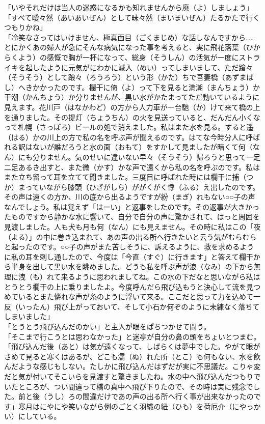 「いやそれだけは当人の迷惑になるかも知れませんから廃（よ）しましょう」\\
「すべて曖々然（あいあいぜん）として昧々然（まいまいぜん）たるかたで行くつもりかね」\\
「冷笑なさってはいけません、極真面目（ごくまじめ）な話しなんですから\ldots{}\ldots{}とにかくあの婦人が急にそんな病気になった事を考えると、実に飛花落葉（ひからくよう）の感慨で胸が一杯になって、総身（そうしん）の活気が一度にストライキを起したように元気がにわかに滅入（めい）ってしまいまして、ただ蹌々（そうそう）として踉々（ろうろう）という形（かた）ちで吾妻橋（あずまばし）へきかかったのです。欄干に倚（よ）って下を見ると満潮（まんちょう）か干潮（かんちょう）か分りませんが、黒い水がかたまってただ動いているように見えます。花川戸（はなかわど）の方から人力車が一台馳（か）けて来て橋の上を通りました。その提灯（ちょうちん）の火を見送っていると、だんだん小くなって札幌（さっぽろ）ビールの処で消えました。私はまた水を見る。すると遥（はる）かの川上の方で私の名を呼ぶ声が聞えるのです。はてな今時分人に呼ばれる訳はないが誰だろうと水の面（おもて）をすかして見ましたが暗くて何（なん）にも分りません。気のせいに違いない早々（そうそう）帰ろうと思って一足二足あるき出すと、また微（かす）かな声で遠くから私の名を呼ぶのです。私はまた立ち留って耳を立てて聞きました。三度目に呼ばれた時には欄干に捕（つか）まっていながら膝頭（ひざがしら）ががくがく悸（ふる）え出したのです。その声は遠くの方か、川の底から出るようですが紛（まぎ）れもない○○子の声なんでしょう。私は覚えず「はーい」と返事をしたのです。その返事が大きかったものですから静かな水に響いて、自分で自分の声に驚かされて、はっと周囲を見渡しました。人も犬も月も何（なん）にも見えません。その時に私はこの「夜（よる）」の中に巻き込まれて、あの声の出る所へ行きたいと云う気がむらむらと起ったのです。○○子の声がまた苦しそうに、訴えるように、救を求めるように私の耳を刺し通したので、今度は「今直（すぐ）に行きます」と答えて欄干から半身を出して黒い水を眺めました。どうも私を呼ぶ声が浪（なみ）の下から無理に洩（も）れて来るように思われましてね。この水の下だなと思いながら私はとうとう欄干の上に乗りましたよ。今度呼んだら飛び込もうと決心して流を見つめているとまた憐れな声が糸のように浮いて来る。ここだと思って力を込めて一反（いったん）飛び上がっておいて、そして小石か何ぞのように未練なく落ちてしまいました」\\
「とうとう飛び込んだのかい」と主人が眼をぱちつかせて問う。\\
「そこまで行こうとは思わなかった」と迷亭が自分の鼻の頭をちょいとつまむ。\\
「飛び込んだ後（あと）は気が遠くなって、しばらくは夢中でした。やがて眼がさめて見ると寒くはあるが、どこも濡（ぬ）れた所（とこ）も何もない、水を飲んだような感じもしない。たしかに飛び込んだはずだが実に不思議だ。こりゃ変だと気が付いてそこいらを見渡すと驚きましたね。水の中へ飛び込んだつもりでいたところが、つい間違って橋の真中へ飛び下りたので、その時は実に残念でした。前と後（うし）ろの間違だけであの声の出る所へ行く事が出来なかったのです」寒月はにやにや笑いながら例のごとく羽織の紐（ひも）を荷厄介（にやっかい）にしている。\\
